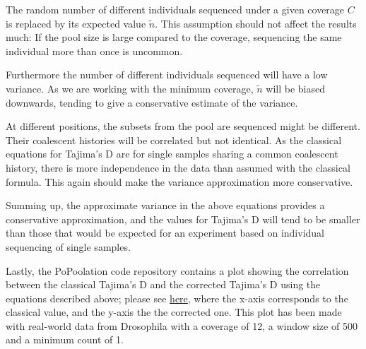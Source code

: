 \documentclass[a4paper,9pt,DIV=14]{scrartcl}
\newcounter{todo}
\newcommand\todo[1]{}
\begin{document}
The random number of different individuals sequenced under a given coverage $C$ 
is replaced by its expected value $\tilde{n}$. 
This assumption should not affect the results much:
If the pool size is large compared to the coverage, sequencing the same individual more than once is uncommon. 

Furthermore the number of different individuals sequenced will have a low variance. 
As we are working with the minimum coverage, $\tilde{n}$ will be biased downwards,
tending to give a conservative estimate of the variance.

At different positions, the subsets from the pool are sequenced might be different. 
Their coalescent histories will be correlated but not identical. 
As the classical equations for Tajima's D are for single samples sharing a common coalescent history, 
there is more independence in the data than assumed with the classical formula.
This again should make the variance approximation more conservative.

Summing up, the approximate variance in the above equations provides a conservative approximation, 
and the values for Tajima's D will tend to be smaller than those that would be expected 
for an experiment based on individual sequencing of single samples.

Lastly, the PoPoolation code repository contains a plot showing the correlation between the classical Tajima's D 
and the corrected Tajima's D using the equations described above;
please see \href{https://github.com/lczech/popoolation/raw/master/files/correlation_classic_correctedTajimasD.png}{here},
where the x-axis corresponds to the classical value, and the y-axis the the corrected one.
This plot has been made with real-world data from Drosophila with a coverage of 12, 
a window size of 500 and a minimum count of 1.




\end{document}

